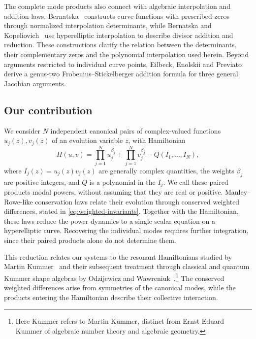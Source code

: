 \documentclass[11pt]{article}
\begin{document}
The complete mode products also connect with algebraic interpolation and addition laws. Bernatska~\cite{bernatska-fields} constructs curve functions with prescribed zeros through normalized interpolation determinants, while Bernatska and Kopeliovich~\cite{divisor-addition} use hyperelliptic interpolation to describe divisor addition and reduction. These constructions clarify the relation between the determinants, their complementary zeros and the polynomial interpolation used herein. Beyond arguments restricted to individual curve points, Eilbeck, Enolskii and Previato~\cite{eep-addition} derive a genus-two Frobenius--Stickelberger addition formula for three general Jacobian arguments.

\subsection{Our contribution}\label{sec:intro-contribution}

We consider $N$ independent canonical pairs of complex-valued functions $u_j(z),v_j(z)$ of an evolution variable $z$, with Hamiltonian
\[
H(u,v)=\prod_{j=1}^{N}u_j^{\beta_j}
       +\prod_{j=1}^{N}v_j^{\beta_j}
       -Q(I_1,\ldots,I_N),
\]
where $I_j(z)=u_j(z)v_j(z)$ are generally complex quantities, the weights $\beta_j$ are positive integers, and $Q$ is a polynomial in the $I_j$. We call these paired products modal powers, without assuming that they are real or positive. Manley--Rowe-like conservation laws relate their evolution through conserved weighted differences, stated in \eqref{eq:weighted-invariants}. Together with the Hamiltonian, these laws reduce the power dynamics to a single scalar equation on a hyperelliptic curve. Recovering the individual modes requires further integration, since their paired products alone do not determine them.

This reduction relates our systems to the resonant Hamiltonians studied by Martin Kummer~\cite{kummer,holm} and their subsequent treatment through classical and quantum Kummer shape algebras by Odzijewicz and Wawreniuk~\cite{shapes}.\footnote{Here Kummer refers to Martin Kummer, distinct from Ernst Eduard Kummer of algebraic number theory and algebraic geometry.} The conserved weighted differences arise from symmetries of the canonical modes, while the products entering the Hamiltonian describe their collective interaction.
\end{document}
